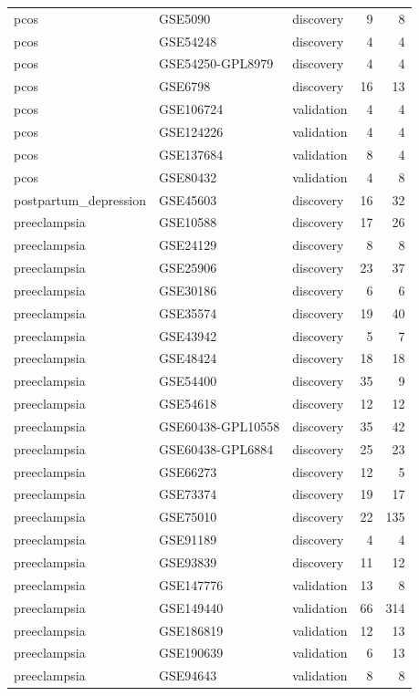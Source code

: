 \begin{longtable}{lllrr}
pcos & GSE5090 & discovery & 9 & 8\\
pcos & GSE54248 & discovery & 4 & 4\\
pcos & GSE54250-GPL8979 & discovery & 4 & 4\\
pcos & GSE6798 & discovery & 16 & 13\\
pcos & GSE106724 & validation & 4 & 4\\
pcos & GSE124226 & validation & 4 & 4\\
pcos & GSE137684 & validation & 8 & 4\\
pcos & GSE80432 & validation & 4 & 8\\
postpartum\_depression & GSE45603 & discovery & 16 & 32\\
preeclampsia & GSE10588 & discovery & 17 & 26\\
preeclampsia & GSE24129 & discovery & 8 & 8\\
preeclampsia & GSE25906 & discovery & 23 & 37\\
preeclampsia & GSE30186 & discovery & 6 & 6\\
preeclampsia & GSE35574 & discovery & 19 & 40\\
preeclampsia & GSE43942 & discovery & 5 & 7\\
preeclampsia & GSE48424 & discovery & 18 & 18\\
preeclampsia & GSE54400 & discovery & 35 & 9\\
preeclampsia & GSE54618 & discovery & 12 & 12\\
preeclampsia & GSE60438-GPL10558 & discovery & 35 & 42\\
preeclampsia & GSE60438-GPL6884 & discovery & 25 & 23\\
preeclampsia & GSE66273 & discovery & 12 & 5\\
preeclampsia & GSE73374 & discovery & 19 & 17\\
preeclampsia & GSE75010 & discovery & 22 & 135\\
preeclampsia & GSE91189 & discovery & 4 & 4\\
preeclampsia & GSE93839 & discovery & 11 & 12\\
preeclampsia & GSE147776 & validation & 13 & 8\\
preeclampsia & GSE149440 & validation & 66 & 314\\
preeclampsia & GSE186819 & validation & 12 & 13\\
preeclampsia & GSE190639 & validation & 6 & 13\\
preeclampsia & GSE94643 & validation & 8 & 8\\
\hline\end{longtable}
